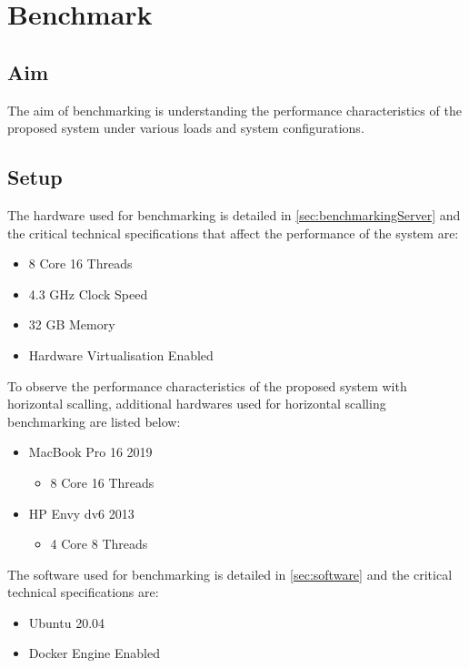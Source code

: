 \documentclass[../thesis.tex]{subfiles}
\begin{document}
\chapter{Benchmark}
\label{chap:bm}

\section{Aim}
The aim of benchmarking is understanding the performance characteristics of the proposed system under various loads and system configurations.

\section{Setup}

The hardware used for benchmarking is detailed in \autoref{sec:benchmarkingServer} and the critical technical specifications that affect the performance of the system are:
\begin{itemize}
\item 8 Core 16 Threads
\item 4.3 GHz Clock Speed
\item 32 GB Memory
\item Hardware Virtualisation Enabled
\end{itemize}

To observe the performance characteristics of the proposed system with horizontal scalling, additional hardwares used for horizontal scalling benchmarking are listed below:
\begin{itemize}
\item MacBook Pro 16 2019
\begin{itemize}
\item 8 Core 16 Threads
\end{itemize}
\item HP Envy dv6 2013
\begin{itemize}
\item 4 Core 8 Threads
\end{itemize}
\end{itemize}


The software used for benchmarking is detailed in \autoref{sec:software} and the critical technical specifications are:
\begin{itemize}
\item Ubuntu 20.04
\item Docker Engine Enabled
\end{itemize}
\end{document}
